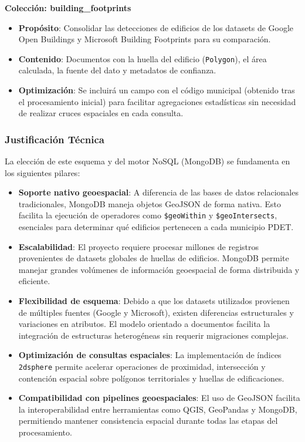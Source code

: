 \documentclass{article}
\begin{document}
\textbf{Colección: building\_footprints}
\begin{itemize}
    \item \textbf{Propósito}: Consolidar las detecciones de edificios de los datasets de Google Open Buildings y Microsoft Building Footprints para su comparación.
    
    \item \textbf{Contenido}: Documentos con la huella del edificio (\texttt{Polygon}), el área calculada, la fuente del dato y metadatos de confianza.
    
    \item \textbf{Optimización}: Se incluirá un campo con el código municipal (obtenido tras el procesamiento inicial) para facilitar agregaciones estadísticas sin necesidad de realizar cruces espaciales en cada consulta.
\end{itemize}

\subsubsection{Justificación Técnica}

La elección de este esquema y del motor NoSQL (MongoDB) se fundamenta en los siguientes pilares:

\begin{itemize}

    \item \textbf{Soporte nativo geoespacial}: A diferencia de las bases de datos relacionales tradicionales, MongoDB maneja objetos GeoJSON de forma nativa. Esto facilita la ejecución de operadores como \texttt{\$geoWithin} y \texttt{\$geoIntersects}, esenciales para determinar qué edificios pertenecen a cada municipio PDET.

    \item \textbf{Escalabilidad}: El proyecto requiere procesar millones de registros provenientes de datasets globales de huellas de edificios. MongoDB permite manejar grandes volúmenes de información geoespacial de forma distribuida y eficiente.

    \item \textbf{Flexibilidad de esquema}: Debido a que los datasets utilizados provienen de múltiples fuentes (Google y Microsoft), existen diferencias estructurales y variaciones en atributos. El modelo orientado a documentos facilita la integración de estructuras heterogéneas sin requerir migraciones complejas.

    \item \textbf{Optimización de consultas espaciales}: La implementación de índices \texttt{2dsphere} permite acelerar operaciones de proximidad, intersección y contención espacial sobre polígonos territoriales y huellas de edificaciones.

    \item \textbf{Compatibilidad con pipelines geoespaciales}: El uso de GeoJSON facilita la interoperabilidad entre herramientas como QGIS, GeoPandas y MongoDB, permitiendo mantener consistencia espacial durante todas las etapas del procesamiento.

\end{itemize}
 
\end{document}
